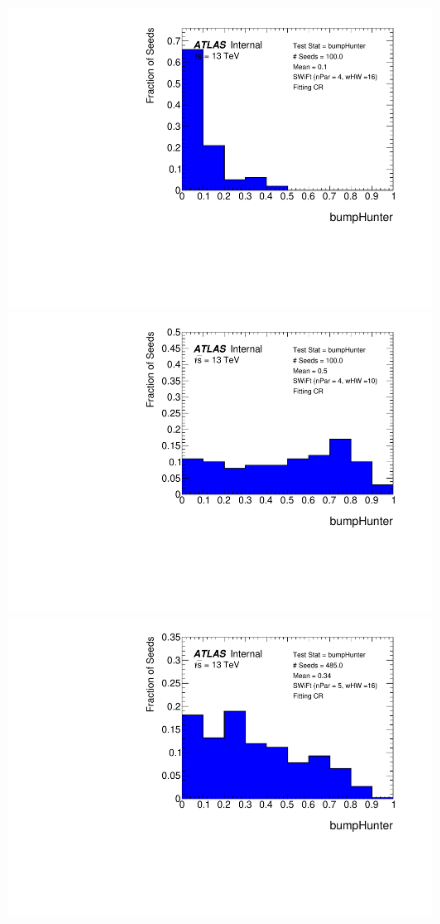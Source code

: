 \begin{figure}[!htb]
\captionsetup[subfigure]{aboveskip=0pt,justification=centering}
\centering
{} {
  \includegraphics[width=0.45\linewidth, angle=0]{figs/Dibjet/LowMass/FitStudy/pVal_bumpHunter_corrFitCR_4para_low16_high16.pdf}
}                                                                                              
 {                                                    
  \includegraphics[width=0.45\linewidth, angle=0]{figs/Dibjet/LowMass/FitStudy/pVal_bumpHunter_corrFitCR_4para_low10_high10.pdf}
}                                                                                              
 {                                                    
  \includegraphics[width=0.45\linewidth, angle=0]{figs/Dibjet/LowMass/FitStudy/pVal_bumpHunter_corrFitCR_5para_low16_high16.pdf}
}
\end{figure}
